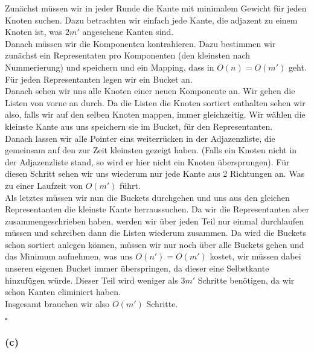 \documentclass[11pt,a4paper,ngerman]{article}
\begin{document}
Zunächst müssen wir in jeder Runde die Kante mit minimalem Gewicht für
jeden Knoten suchen. Dazu betrachten wir einfach jede Kante,
die adjazent zu einem Knoten ist, was $2m'$ angesehene Kanten sind.\\

Danach müssen wir die Komponenten kontrahieren. Dazu bestimmen
wir zunächst ein Representaten pro Komponenten (den kleinsten
nach Nummerierung) und speichern und
ein Mapping, dass in $O(n) = O(m')$ geht.\\

Für jeden Representanten legen wir ein Bucket an.\\

Danach sehen wir uns alle Knoten einer neuen Komponente an. Wir gehen
die Listen von vorne an durch. Da die Listen die Knoten sortiert enthalten
sehen wir also, falls wir auf den selben Knoten mappen, immer gleichzeitig.
Wir wählen die kleinste Kante aus uns speichern sie im Bucket, für den Representanten.\\

Danach lassen wir alle Pointer eins weiterrücken in der Adjazenzliste,
die gemeinsam auf den zur Zeit kleinsten gezeigt haben. (Falls ein
Knoten nicht in der Adjazenzliste stand, so wird er hier nicht ein
Knoten übersprungen). 
Für diesen Schritt sehen wir uns wiederum nur jede Kante aus 2 Richtungen
an. Was zu einer Laufzeit von $O(m')$ führt.\\

Als letztes müssen wir nun die Buckets durchgehen und uns aus
den gleichen Representanten die kleinste Kante herraussuchen. Da wir
die Representanten aber zusammengeschrieben haben, werden wir über
jeden Teil nur einmal durchlaufen müssen und schreiben dann die Listen
wiederum zusammen. Da wird die Buckets schon sortiert anlegen können,
müssen wir nur noch über alle Buckets gehen und das Minimum aufnehmen,
was uns $O(n') = O(m')$ kostet, wir müssen dabei unseren eigenen Bucket immer
überspringen, da dieser eine Selbstkante hinzufügen würde.
Dieser Teil wird weniger als $3m'$ Schritte benötigen, da wir schon Kanten
eliminiert haben.\\

Insgesamt brauchen wir also $O(m')$ Schritte.

\mbox{}\hfill$\square$

\subsubsection*{(c)}
\end{document}
